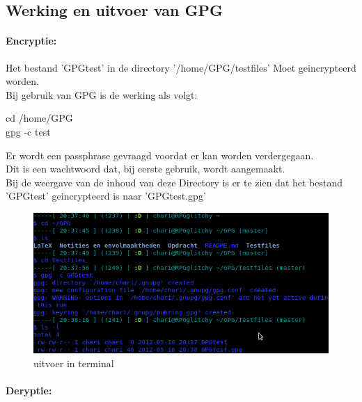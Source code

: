 \documentclass[12pt]{article}
\begin{document}
			\newpage		
			\subsection{Werking en uitvoer van GPG}\label{Werk}	
				\paragraph*{Encryptie:}
				Het bestand 'GPGtest' in de directory '/home/GPG/testfiles' Moet geincrypteerd 							worden.\\
				Bij gebruik van GPG is de werking als volgt:\\
					\begin{center}
						cd /home/GPG\\
						gpg -c test
					\end{center}
				Er wordt een passphrase gevraagd voordat er kan worden verdergegaan.\\
				Dit is een wachtwoord dat, bij eerste gebruik, wordt aangemaakt.\\
				Bij de weergave van de inhoud van deze Directory is er te zien dat het bestand 							'GPGtest' geincrypteerd is naar 'GPGtest.gpg'
				
				\begin{figure}[!ht]
					\begin{center}
						\includegraphics[scale=0.4]{Pictures/terminal}
					\end{center}
					\caption{uitvoer in terminal}
				\end{figure}
				
				\paragraph*{Deryptie:}				
			
			\newpage
\end{document}
